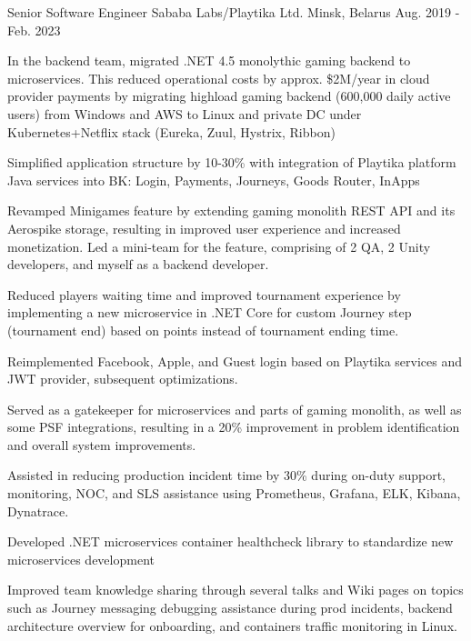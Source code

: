 \begin{cventries}
  \cventry
    {Senior Software Engineer} %
    {Sababa Labs/Playtika Ltd.} %
    {Minsk, Belarus} %
    {Aug. 2019 - Feb. 2023} %
    {
      \begin{cvitems} %
        \item {In the backend team, migrated .NET 4.5 monolythic gaming backend to microservices. This reduced operational costs by approx. \$2M/year in cloud provider payments by migrating highload gaming backend (600,000 daily active users) from Windows and AWS to Linux and private DC under Kubernetes+Netflix stack (Eureka, Zuul, Hystrix, Ribbon)}
        \item {Simplified application structure by 10-30\% with integration of Playtika platform Java services into BK: Login, Payments, Journeys, Goods Router, InApps}
        \item {Revamped Minigames feature by extending gaming monolith REST API and its Aerospike storage, resulting in improved user experience and increased monetization. Led a mini-team for the feature, comprising of 2 QA, 2 Unity developers, and myself as a backend developer.}
        \item {Reduced players waiting time and improved tournament experience by implementing a new microservice in .NET Core for custom Journey step (tournament end) based on points instead of tournament ending time.}
        \item {Reimplemented Facebook, Apple, and Guest login based on Playtika services and JWT provider, subsequent optimizations.}
        \item {Served as a gatekeeper for microservices and parts of gaming monolith, as well as some PSF integrations, resulting in a 20\% improvement in problem identification and overall system improvements.}
        \item {Assisted in reducing production incident time by 30\% during on-duty support, monitoring, NOC, and SLS assistance using Prometheus, Grafana, ELK, Kibana, Dynatrace.}
        \item {Developed .NET microservices container healthcheck library to standardize new microservices development}
        \item {Improved team knowledge sharing through several talks and Wiki pages on topics such as Journey messaging debugging assistance during prod incidents, backend architecture overview for onboarding, and containers traffic monitoring in Linux.}
      \end{cvitems}
    }


\end{cventries}
